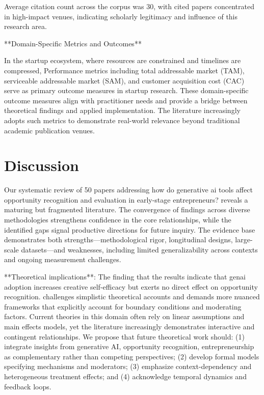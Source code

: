 \documentclass[11pt, a4paper]{article}
\begin{document}
Average citation count across the corpus was 30, with cited papers concentrated in high-impact venues, indicating scholarly legitimacy and influence of this research area.

**Domain-Specific Metrics and Outcomes**

In the startup ecosystem, where resources are constrained and timelines are compressed, Performance metrics including total addressable market (TAM), serviceable addressable market (SAM), and customer acquisition cost (CAC) serve as primary outcome measures in startup research. These domain-specific outcome measures align with practitioner needs and provide a bridge between theoretical findings and applied implementation. The literature increasingly adopts such metrics to demonstrate real-world relevance beyond traditional academic publication venues.

\section{Discussion}
Our systematic review of 50 papers addressing how do generative ai tools affect opportunity recognition and evaluation in early-stage entrepreneurs? reveals a maturing but fragmented literature. The convergence of findings across diverse methodologies strengthens confidence in the core relationships, while the identified gaps signal productive directions for future inquiry. The evidence base demonstrates both strengths—methodological rigor, longitudinal designs, large-scale datasets—and weaknesses, including limited generalizability across contexts and ongoing measurement challenges.

**Theoretical implications**: The finding that the results indicate that genai adoption increases creative self-efficacy but exerts no direct effect on opportunity recognition. challenges simplistic theoretical accounts and demands more nuanced frameworks that explicitly account for boundary conditions and moderating factors. Current theories in this domain often rely on linear assumptions and main effects models, yet the literature increasingly demonstrates interactive and contingent relationships. We propose that future theoretical work should: (1) integrate insights from generative AI, opportunity recognition, entrepreneurship as complementary rather than competing perspectives; (2) develop formal models specifying mechanisms and moderators; (3) emphasize context-dependency and heterogeneous treatment effects; and (4) acknowledge temporal dynamics and feedback loops.
\end{document}
